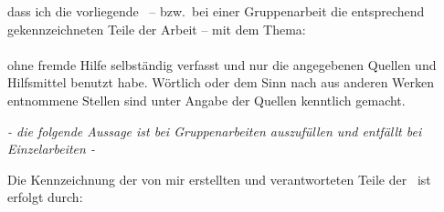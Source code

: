 dass ich die vorliegende \Dokumentenart\ -- bzw.\ bei einer Gruppenarbeit die entsprechend gekennzeichneten Teile der Arbeit -- mit dem Thema:\\

\textbf{\Titel}\\

ohne fremde Hilfe selbständig verfasst und nur die angegebenen Quellen und Hilfsmittel benutzt habe.
Wörtlich oder dem Sinn nach aus anderen Werken entnommene Stellen sind unter Angabe der Quellen kenntlich gemacht.

\begin{center}
  \emph{\footnotesize- die folgende Aussage ist bei Gruppenarbeiten auszufüllen und entfällt bei Einzelarbeiten -}
\end{center}

Die Kennzeichnung der von mir erstellten und verantworteten Teile der \Dokumentenart\ ist erfolgt durch:

\vspace{1.5cm}

\vspace{1cm}
\noindent{} \hspace{0.1cm}
    \makebox[3cm]{\Datum} \hspace{0.1cm}
    \makebox[6cm]{} \\
\noindent\makebox[3cm]{\hrulefill} \hspace{0.1cm}
    \makebox[3cm]{\hrulefill} \hspace{0.1cm}
    \makebox[6cm]{\hrulefill} \\
\noindent{} \hspace{0.1cm}
     \hspace{0.1cm}
    
\clearpage